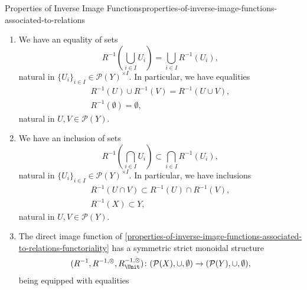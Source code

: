 \begin{proposition}{Properties of Inverse Image Functions}{properties-of-inverse-image-functions-associated-to-relations}
\begin{enumerate}
\begin{itemize}
\begin{itemize}
                    \end{itemize}
            \end{itemize}
        \item\label{properties-of-inverse-image-functions-associated-to-relations-preservation-of-colimits}We have an equality of sets
            \[
                R^{-1}(\bigcup_{i\in I}U_{i})%
                =%
                \bigcup_{i\in I}R^{-1}(U_{i}),%
            \]%
            natural in $\{U_{i}\}_{i\in I}\in\mathcal{P}(Y)^{\times I}$. In particular, we have equalities%
            \[
                \begin{gathered}
                    R^{-1}(U)\cup R^{-1}(V) = R^{-1}(U\cup V),\\
                    R^{-1}(\emptyset)       = \emptyset,
                \end{gathered}
            \]%
            natural in $U,V\in\mathcal{P}(Y)$.
        \item\label{properties-of-inverse-image-functions-associated-to-relations-oplax-preservation-of-limits}We have an inclusion of sets
            \[
                R^{-1}(\bigcap_{i\in I}U_{i})%
                \subset%
                \bigcap_{i\in I}R^{-1}(U_{i}),%
            \]%
            natural in $\{U_{i}\}_{i\in I}\in\mathcal{P}(Y)^{\times I}$. In particular, we have inclusions%
            \[
                \begin{gathered}
                    R^{-1}(U\cap V) \subset R^{-1}(U)\cap R^{-1}(V),\\
                    R^{-1}(X)       \subset Y,
                \end{gathered}
            \]%
            natural in $U,V\in\mathcal{P}(Y)$.
        \item\label{properties-of-inverse-image-functions-associated-to-relations-symmetric-strict-monoidality-with-respect-to-unions}The direct image function of \cref{properties-of-inverse-image-functions-associated-to-relations-functoriality} has a symmetric strict monoidal structure
            \[
                (R^{-1},R^{-1,\otimes},R^{-1,\otimes}_{\Unit})
                \colon
                (\mathcal{P}(X),\cup,\emptyset)
                \to
                (\mathcal{P}(Y),\cup,\emptyset),
            \]%
            being equipped with equalities%
            \[
                \begin{gathered}

\end{gathered}\]
\end{enumerate}
\end{proposition}
